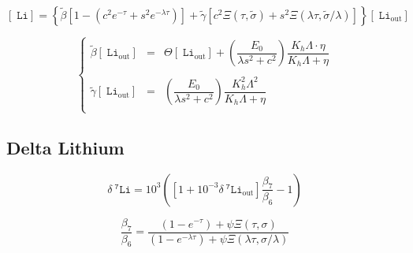 \documentclass[aps,onecolumn,12pt]{revtex4}
\newcommand{\mychem}[1]{\mathtt{#1}}
\newcommand{\myconc}[1]{\left\lbrack{#1}\right\rbrack}
\newcommand{\spLi}[1]{{~^{\mychem{#1}}\mychem{Li}}}
\newcommand{\Li}[1]{\myconc{\spLi{#1}}}
\newcommand{\spLiOut}[1]{{\spLi{#1}}_{\mathrm{out}}}
\newcommand{\LiOut}[1]{\myconc{\spLiOut{#1}}}
\newcommand{\deltaLi}{ {\delta\!\!\!\spLi{7}} }
\newcommand{\deltaLiOut}{{\deltaLi}_{\mathrm{out}}}
\begin{document}
\begin{equation}
\Li{} = \left\lbrace\tilde\beta\left[ 1 - \left(c^2e^{-\tau}+s^2e^{-\lambda\tau}\right) \right] 
+ \tilde\gamma\left[ c^2\Xi\left(\tau,\tilde\sigma\right) + s^2\Xi\left(\lambda\tau,\tilde\sigma/\lambda\right)\right]\right\rbrace \LiOut{}
\end{equation}

\begin{equation}
\left\lbrace
	\begin{array}{rcl}
	\tilde\beta\LiOut{} & = & \Theta\LiOut{} + \left(\dfrac{E_0}{\lambda s^2 + c^2}\right) \dfrac{ K_h \Lambda \cdot \eta}{ K_h \Lambda + \eta }\\
	\\
	\tilde\gamma\LiOut{} & = & \left(\dfrac{E_0}{\lambda s^2 + c^2}\right) \dfrac{K_h^2 \Lambda^2}{K_h \Lambda + \eta}\\
	\end{array}
\right.
\end{equation}

\subsection{Delta Lithium}
\begin{equation}
	\deltaLi = 10^3 \left( \left[1+10^{-3}\deltaLiOut\right] \dfrac{\beta_7}{\beta_6} - 1\right)
\end{equation}

\begin{equation}
	\dfrac{\beta_7}{\beta_6} = 
	\dfrac
	{\left(1-e^{-\tau}\right) + \psi \Xi\left(\tau,\sigma\right)}
	{\left(1-e^{-\lambda\tau}\right) + \psi \Xi\left(\lambda\tau,\sigma/\lambda\right)}
\end{equation}
\end{document}

